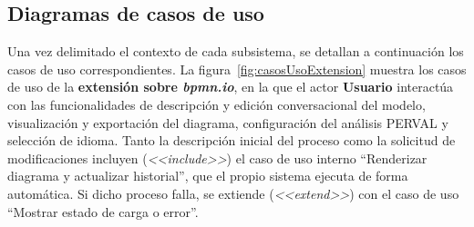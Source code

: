 {\subsection{Diagramas de casos de uso}
\label{subsec:diagramasCasosUso}

Una vez delimitado el contexto de cada subsistema, se detallan a continuación los casos de uso correspondientes. La figura~\ref{fig:casosUsoExtension} muestra los casos de uso de la \textbf{extensión sobre \textit{bpmn.io}}, en la que el actor \textbf{Usuario} interactúa con las funcionalidades de descripción y edición conversacional del modelo, visualización y exportación del diagrama, configuración del análisis PERVAL y selección de idioma. Tanto la descripción inicial del proceso como la solicitud de modificaciones incluyen (\textit{\textless\textless include\textgreater\textgreater}) el caso de uso interno ``Renderizar diagrama y actualizar historial'', que el propio sistema ejecuta de forma automática. Si dicho proceso falla, se extiende (\textit{\textless\textless extend\textgreater\textgreater}) con el caso de uso ``Mostrar estado de carga o error''.

\begin{figure}[h!]
\centering
{}
\end{figure}}
